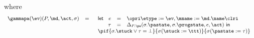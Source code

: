 \noindent where
\[
{\small
\begin{array}{rcl}
\gammapa(\ev)(P, \md, \act, \sigma) & = &
\begin{array}[t]{l}
\mathsf{let\ }
\begin{array}[t]{rcl}
  e & = & \opri \etype := \ev, \mname := \md.\name \clri\\
 \tau & = & \Delta_{P.\pa}(\sigma.\pastate, \sigma.\progstate, e, \act)
\mathsf{\ in\ }\end{array}
\\
\pif{\sigma.\stuck \vee \tau = \bot}
    {\sigma (\stuck := \ttt)}
    {\sigma (\pastate := \tau)}
\end{array}
\end{array}}
\]
